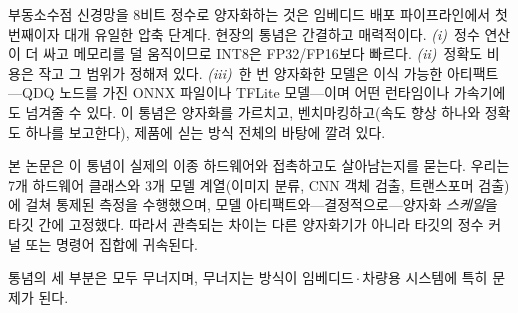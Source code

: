 \documentclass[11pt]{article}
\begin{document}
부동소수점 신경망을 8비트 정수로 양자화하는 것은 임베디드 배포 파이프라인에서 첫 번째이자 대개 유일한 압축 단계다. 현장의 통념은 간결하고 매력적이다. \emph{(i)}~정수 연산이 더 싸고 메모리를 덜 움직이므로 INT8은 FP32/FP16보다 빠르다. \emph{(ii)}~정확도 비용은 작고 그 범위가 정해져 있다. \emph{(iii)}~한 번 양자화한 모델은 이식 가능한 아티팩트---QDQ 노드를 가진 ONNX 파일이나 TFLite 모델---이며 어떤 런타임이나 가속기에도 넘겨줄 수 있다. 이 통념은 양자화를 가르치고, 벤치마킹하고(속도 향상 하나와 정확도 하나를 보고한다), 제품에 싣는 방식 전체의 바탕에 깔려 있다.

본 논문은 이 통념이 실제의 이종 하드웨어와 접촉하고도 살아남는지를 묻는다. 우리는 7개 하드웨어 클래스와 3개 모델 계열(이미지 분류, CNN 객체 검출, 트랜스포머 검출)에 걸쳐 통제된 측정을 수행했으며, 모델 아티팩트와---결정적으로---양자화 \emph{스케일}을 타깃 간에 고정했다. 따라서 관측되는 차이는 다른 양자화기가 아니라 타깃의 정수 커널 또는 명령어 집합에 귀속된다.

통념의 세 부분은 모두 무너지며, 무너지는 방식이 임베디드\,$\cdot$\,차량용 시스템에 특히 문제가 된다.
\end{document}
